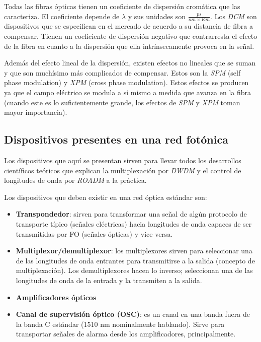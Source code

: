 Todas las fibras ópticas tienen un coeficiente de dispersión cromática
que las caracteriza. El coeficiente depende de $\lambda$ y sus
unidades son $\frac{ps}{nm \times Km}$. Los \emph{DCM} son
dispositivos que se especifican en el mercado de acuerdo a su
distancia de fibra a compensar. Tienen un coeficiente de dispersión
negativo que contrarresta el efecto de la fibra en cuanto a la
dispersión que ella intrínsecamente provoca en la señal.

Además del efecto lineal de la dispersión, existen efectos no lineales
que se suman y que son muchísimo más complicados de compensar. Estos
son la \emph{SPM} (self phase modulation) y \emph{XPM} (cross phase
modulation). Estos efectos se producen ya que el campo eléctrico se
modula a sí mismo a medida que avanza en la fibra (cuando este es lo
suficientemente grande, los efectos de \emph{SPM} y \emph{XPM} toman
mayor importancia).

\subsection{Dispositivos presentes en una red fotónica}
\label{sec:dispositivos}

Los dispositivos que aquí se presentan sirven para llevar todos los
desarrollos científicos teóricos que explican la multiplexación por
\emph{DWDM} y el control de longitudes de onda por \emph{ROADM} a la
práctica.

Los dispositivos que deben existir en una red óptica estándar son:
\begin{itemize}
\item \textbf{Transpondedor}: sirven para transformar una señal de
  algún protocolo de transporte típico (señales eléctricas) hacia
  longitudes de onda capaces de ser transmitidas por FO (señales
  ópticas) y vice versa.
\item \textbf{Multiplexor/demultiplexor}: los multiplexores sirven
  para seleccionar una de las longitudes de onda entrantes para
  transmitirse a la salida (concepto de multiplexación). Los
  demultiplexores hacen lo inverso; seleccionan una de las longitudes
  de onda de la entrada y la transmiten a la salida.
\item \textbf{Amplificadores ópticos}
\item \textbf{Canal de supervisión óptico (OSC)}: es un canal en una
  banda fuera de la banda C estándar (1510 nm nominalmente
  hablando). Sirve para transportar señales de alarma desde los
  amplificadores, principalmente.
\end{itemize}